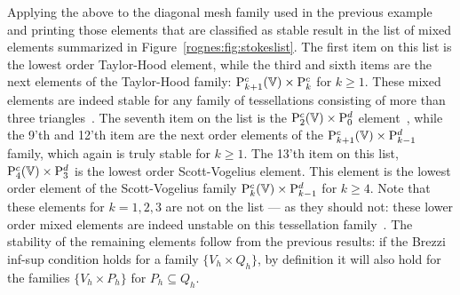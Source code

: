 Applying the above to the diagonal mesh family used in the previous
example and printing those elements that are classified as stable
result in the list of mixed elements summarized in
Figure~\ref{rognes:fig:stokeslist}. The first item on this list is the
lowest order Taylor-Hood element, while the third and sixth items are
the next elements of the Taylor-Hood family:
$\mathrm{P}^c_{k+1}(\mathbb{V}) \times \mathrm{P}^c_{k}$ for $k \geq
1$. These mixed elements are indeed stable for any family of
tessellations consisting of more than three
triangles~\cite{TaylorHood1973, stenberg:1984, BrezziFalk1991}. The
seventh item on the list is the
$\mathrm{P}^c_2(\mathbb{V}) \times \mathrm{P}^d_0$
element~\cite{CrouzeixRaviart1973}, while the 9'th and 12'th item are
the next order elements of the $\mathrm{P}^c_{k+1}(\mathbb{V}) \times
\mathrm{P}^d_{k-1}$ family, which again is truly stable for $k \geq
1$. The 13'th item on this list, $\mathrm{P}^c_4(\mathbb{V}) \times
\mathrm{P}^d_3$ is the lowest order Scott-Vogelius element. This element
is the lowest order element of the Scott-Vogelius family
$\mathrm{P}^c_{k}(\mathbb{V}) \times \mathrm{P}^d_{k-1}$ for $k \geq
4$. Note that these elements for $k = 1, 2, 3$ are not on the list ---
as they should not: these lower order mixed elements are indeed
unstable on this tessellation family~\cite{Qin1994}. The stability of
the remaining elements follow from the previous results: if the Brezzi
inf-sup condition holds for a family $\{V_h \times Q_h\}$, by
definition it will also hold for the families $\{V_h \times P_h\}$ for
$P_h \subseteq Q_h$.
